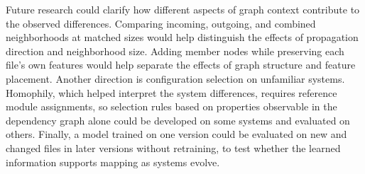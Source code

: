  Future research could clarify how different aspects of graph context contribute to the observed differences. Comparing incoming, outgoing, and combined neighborhoods at matched sizes would help distinguish the effects of propagation direction and neighborhood size. Adding member nodes while preserving each file's own features would help separate the effects of graph structure and feature placement. Another direction is configuration selection on unfamiliar systems. Homophily, which helped interpret the system differences, requires reference module assignments, so selection rules based on properties observable in the dependency graph alone could be developed on some systems and evaluated on others. Finally, a model trained on one version could be evaluated on new and changed files in later versions without retraining, to test whether the learned information supports mapping as systems evolve.
